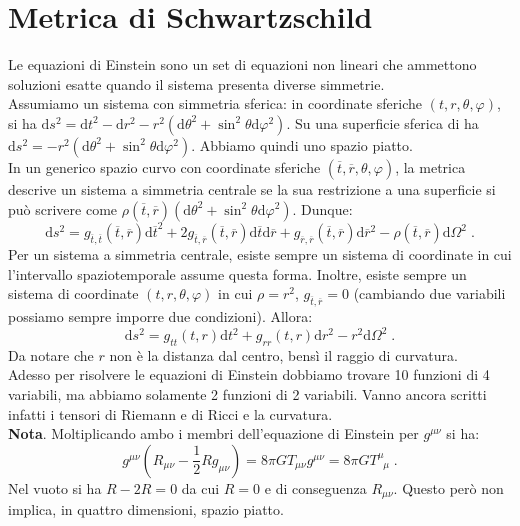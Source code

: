 \documentclass[12pt,a4paper]{report}
\theoremstyle{definition}
\newcommand{\diff}[1][]{\mathrm{d}#1}
\begin{document}
\section{Metrica di Schwartzschild}
Le equazioni di Einstein sono un set di equazioni non lineari che ammettono soluzioni esatte quando il sistema presenta diverse simmetrie. \\
Assumiamo un sistema con simmetria sferica: in coordinate sferiche $(t,r,\theta,\varphi)$, si ha $\diff{s^2}=\diff{t}^2-\diff{r}^2-r^2(\diff{\theta}^2+\sin^2\theta\diff{\varphi}^2)$. Su una superficie sferica di ha $\diff{s}^2=-r^2(\diff{\theta}^2+\sin^2\theta\diff{\varphi}^2)$. Abbiamo quindi uno spazio piatto. \\
In un generico spazio curvo con coordinate sferiche $(\overline{t},\overline{r},\theta,\varphi)$, la metrica descrive un sistema a simmetria centrale se la sua restrizione a una superficie si può scrivere come $\rho(\overline{t},\overline{r})(\diff{\theta}^2+\sin^2\theta\diff{\varphi}^2)$. Dunque:
\begin{equation}
\diff{s}^2=g_{\overline{t},\overline{t}}(\overline{t},\overline{r})\diff{\overline{t}}^2+
2g_{\overline{t},\overline{r}}(\overline{t},\overline{r})\diff{\overline{t}}\diff{\overline{r}}+
g_{\overline{r},\overline{r}}(\overline{t},\overline{r})\diff{\overline{r}}^2-\rho(\overline{t},\overline{r})\diff{\Omega}^2\;.
\end{equation}
Per un sistema a simmetria centrale, esiste sempre un sistema di coordinate in cui l'intervallo spaziotemporale assume questa forma. Inoltre, esiste sempre un sistema di coordinate $(t,r,\theta,\varphi)$ in cui $\rho=r^2$, $g_{\overline{t},\overline{r}}=0$ (cambiando due variabili possiamo sempre imporre due condizioni). Allora:
\begin{equation}
\diff{s}^2=g_{tt}(t,r)\diff{t}^2+g_{rr}(t,r)\diff{r}^2-r^2\diff{\Omega}^2\;.
\end{equation}
Da notare che $r$ non è la distanza dal centro, bensì il raggio di curvatura. \\
Adesso per risolvere le equazioni di Einstein dobbiamo trovare 10 funzioni di 4 variabili, ma abbiamo solamente 2 funzioni di 2 variabili. Vanno ancora scritti infatti i tensori di Riemann e di Ricci e la curvatura. \\
\textbf{Nota}. Moltiplicando ambo i membri dell'equazione di Einstein per $g^{\mu\nu}$ si ha:
$$
g^{\mu\nu}\left(R_{\mu\nu}-\frac{1}{2}Rg_{\mu\nu}\right)=8\pi GT_{\mu\nu}g^{\mu\nu}=8\pi GT^{\mu}_{\;\;\mu}\;.
$$
Nel vuoto si ha $R-2R=0$ da cui $R=0$ e di conseguenza $R_{\mu\nu}$. Questo però non implica, in quattro dimensioni, spazio piatto. \\
\end{document}

